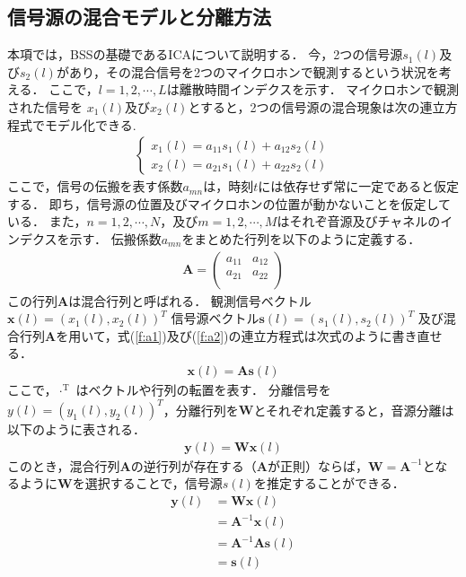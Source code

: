 \subsection{信号源の混合モデルと分離方法}
本項では，BSSの基礎であるICAについて説明する．
今，2つの信号源$s_1(l)$及び$s_2(l)$があり，その混合信号を2つのマイクロホンで観測するという状況を考える．
ここで，$l = 1, 2, \cdots , L$は離散時間インデクスを示す．
マイクロホンで観測された信号を
$x_1(l)$及び$x_2(l)$とすると，2つの信号源の混合現象は次の連立方程式でモデル化できる.
\begin{eqnarray}
  \begin{cases}
    x_1(l) = a_{11}s_1(l) + a_{12}s_2(l)  \label{f:a1}\\
    x_2(l) = a_{21}s_1(l) + a_{22}s_2(l)  \label{f:a2}
  \end{cases}
\end{eqnarray}
ここで，信号の伝搬を表す係数$a_{mn}$は，時刻$t$には依存せず常に一定であると仮定する．
即ち，信号源の位置及びマイクロホンの位置が動かないことを仮定している．
また，$n = 1, 2, \cdots , N$，及び$m =
1, 2, \cdots , M $はそれぞ音源及びチャネルのインデクスを示す．
伝搬係数$a_{mn}$をまとめた行列を以下のように定義する．
\begin{align}
    \bm{A} = \begin{pmatrix}
    a_{11}  & a_{12}  \\
    a_{21}  & a_{22}  \\
    \end{pmatrix}
\end{align}
この行列$\bm{A}$は混合行列と呼ばれる．
観測信号ベクトル$\bm{x}(l) = (x_1(l),x_2(l))^T$
信号源ベクトル$\bm{s}(l) = (s_1(l),s_2(l))^T$
及び混合行列$\bm{A}$を用いて，式(\ref{f:a1})及び(\ref{f:a2})の連立方程式は次式のように書き直せる．
\begin{align}
    \bm{x}(l) = \bm{A}\bm{s}(l)　\label{f:x}
\end{align}
ここで，$\cdot^\mathrm{T}$ はベクトルや行列の転置を表す．
分離信号を$y(l) = (y_1(l),y_2(l))^T$，分離行列を$\bm{W}$とそれぞれ定義すると，音源分離は以下のように表される．
\begin{align}
    \bm{y}(l) = \bm{W}\bm{x}(l)
\end{align}
このとき，混合行列$\bm{A}$の逆行列が存在する（$\bm{A}$が正則）ならば，$\bm{W}=\bm{A}^{-1}$となるように$\bm{W}$を選択することで，信号源$s(l)$を推定することができる．
\begin{align}
    \bm{y}(l) &= \bm{W}\bm{x}(l)\\
    &= \bm{A}^{-1}\bm{x}(l)\\
    &= \bm{A}^{-1}\bm{A}\bm{s}(l)\\
    &= \bm{s}(l)
\end{align}

